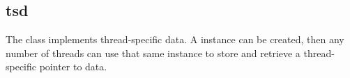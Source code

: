 %
%
%
%
%              

\subsection{tsd}
\label{tsd}

The  class implements thread-specific data.  A 
instance can be created, then any number of threads can use that same instance
to store and retrieve a thread-specific pointer to data.

